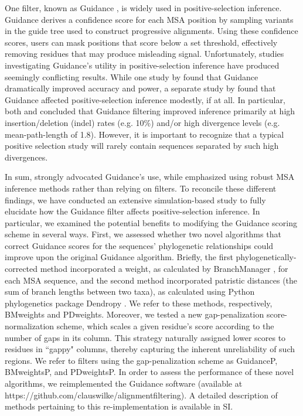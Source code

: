 \documentclass[11pt]{article}
\begin{document}
One filter, known as Guidance \citep{Penn2010}, is widely used in positive-selection inference. Guidance derives a confidence score for each MSA position by sampling variants in the guide tree used to construct progressive alignments. Using these confidence scores, users can mask positions that score below a set threshold, effectively removing residues that may produce misleading signal. Unfortunately, studies investigating Guidance's utility in positive-selection inference have produced seemingly conflicting results. While one study by \citet{Privman2012} found that Guidance dramatically improved accuracy and power, a separate study by \citet{Jordan2012} found that Guidance affected positive-selection inference modestly, if at all. In particular, both \citet{Privman2012} and \citet{Jordan2012} concluded that Guidance filtering improved inference primarily at high insertion/deletion (indel) rates (e.g. 10\%) and/or high divergence levels (e.g. mean-path-length of 1.8). However, it is important to recognize that a typical positive selection study will rarely contain sequences separated by such high divergences. 

In sum, \citet{Privman2012} strongly advocated Guidance's use, while \citet{Jordan2012} emphasized using robust MSA inference methods rather than relying on filters. To reconcile these different findings, we have conducted an extensive simulation-based study to fully elucidate how the Guidance filter affects positive-selection inference. In particular, we examined the potential benefits to modifying the Guidance scoring scheme in several ways.  First, we assessed whether two novel algorithms that correct Guidance scores for the sequences' phylogenetic relationships could improve upon the original Guidance algorithm. Briefly, the first phylogenetically-corrected method incorporated a weight, as calculated by BranchManager \citep{Stone2007}, for each MSA sequence, and the second method incorporated patristic distances (the sum of branch lengths between two taxa), as calculated using Python phylogenetics package Dendropy \citep{Sukumaran2010}. We refer to these methods, respectively, BMweights and PDweights. Moreover, we tested a new gap-penalization score-normalization scheme, which scales a given residue's score according to the number of gaps in its column. This strategy naturally assigned lower scores to residues in ``gappy" columns, thereby capturing the inherent unreliability of such regions. We refer to filters using the gap-penalization scheme as GuidanceP, BMweightsP, and PDweightsP. In order to assess the performance of these novel algorithms, we reimplemented the Guidance software (available at https://github.com/clauswilke/alignment\underline{\hspace*{0.2cm}}filtering). A detailed description of methods pertaining to this re-implementation is available in SI.
\end{document}
